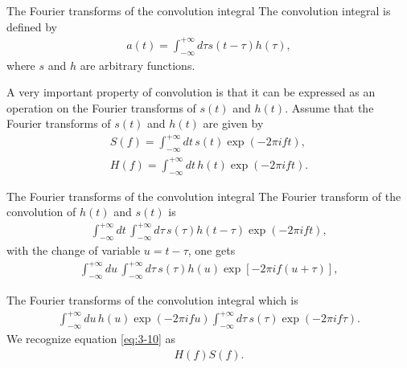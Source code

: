 \documentclass[xcolor=dvipsnames,notes]{beamer}
\begin{document}
\begin{frame}{The Fourier transforms of the convolution integral}
The convolution integral is defined by
\begin{eqnarray}
a(t)=\int^{+\infty}_{-\infty} d\tau s(t-\tau)h(\tau),
\end{eqnarray}
where $s$ and $h$ are arbitrary functions.

A very important property of convolution is that it can be expressed as
an operation on the Fourier transforms of $s(t)$ and $h(t)$.
Assume that the Fourier transforms of $s(t)$ and $h(t)$ are given by
%
\begin{eqnarray}
 S(f) = \int^{+\infty}_{-\infty} dt\, s(t) 
      \exp(-2\pi i f t) ,\\
 H(f) = \int^{+\infty}_{-\infty} dt\, h(t) 
      \exp(-2\pi i f t).
\end{eqnarray}
%
\end{frame}
\begin{frame}{The Fourier transforms of the convolution integral}
The Fourier transform of the convolution of $h(t)$ and $s(t)$ is
%
\begin{eqnarray}
 \int^{+\infty}_{-\infty}dt\, 
\int^{+\infty}_{-\infty}d\tau\, s(\tau) h(t-\tau)\exp(-2\pi i f t),
\end{eqnarray}
%
with the change of variable $u=t-\tau$, one gets 
%
\begin{eqnarray}
 \int^{+\infty}_{-\infty}du\, 
\int^{+\infty}_{-\infty}d\tau\, s(\tau) h(u)\exp[-2\pi i f (u+\tau)],
\end{eqnarray}
%
\end{frame}
\begin{frame}{The Fourier transforms of the convolution integral}
which is
%
\begin{eqnarray}
 \int^{+\infty}_{-\infty}du\, h(u)\exp(-2\pi i f u)
\int^{+\infty}_{-\infty}d\tau\, s(\tau) \exp(-2\pi i f \tau).
   \label{eq:3-10} 
\end{eqnarray}
%
We recognize equation \eqref{eq:3-10} as
%
\begin{eqnarray}
  H(f) S(f).
   \label{eq:3-11} 
\end{eqnarray}
\end{frame}
\end{document}
